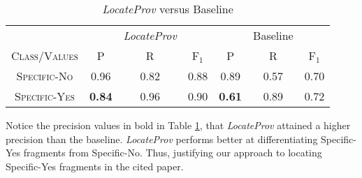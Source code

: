 \begin{table}[h]
	\center
	\begin{tabular}{ c | c  c  c | c c c }
		& & {\it LocateProv} & & & Baseline \\
		\textsc{Class/Values} & \textsc{P} & \textsc{R} & \textsc{F$_1$} & \textsc{P} & \textsc{R} & \textsc{F$_1$}  \\
		\hline
		\textsc{Specific-No} 			& 0.96  &    0.82   &   0.88 & 0.89   &   0.57   &   0.70 \\
		\textsc{Specific-Yes} 			& {\bf 0.84}  &    0.96   &   0.90 & {\bf 0.61}   &   0.89   &   0.72 \\
	\end{tabular}
	\caption{{\it LocateProv} versus Baseline}
	\label{tab:locateprov_vs_baseline}
\end{table}
Notice the precision values in bold in Table \ref{tab:locateprov_vs_baseline}, that {\it LocateProv} attained a higher precision than the baseline. {\it LocateProv} performs better at differentiating Specific-Yes fragments from Specific-No. Thus, justifying our approach to locating Specific-Yes fragments in the cited paper.